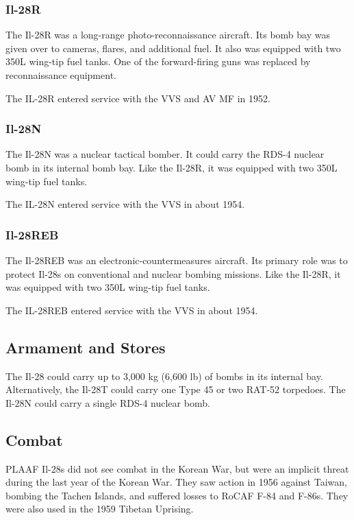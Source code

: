 \subsubsection{Il-28R}

The Il-28R was a long-range photo-reconnaissance aircraft. Its bomb bay was given over to cameras, flares, and additional fuel. It also was equipped with two 350L wing-tip fuel tanks. One of the forward-firing guns was replaced by reconnaissance equipment.

The IL-28R entered service with the VVS and AV MF in 1952.

\subsubsection{Il-28N}

The Il-28N was a nuclear tactical bomber. It could carry the RDS-4 nuclear bomb in its internal bomb bay. Like the Il-28R, it was equipped with two 350L wing-tip fuel tanks.

The IL-28N entered service with the VVS in about 1954.

\subsubsection{Il-28REB}

The Il-28REB was an electronic-countermeasures aircraft. Its primary role was to protect Il-28s on conventional and nuclear bombing missions. Like the Il-28R, it was equipped with two 350L wing-tip fuel tanks.

The IL-28REB entered service with the VVS in about 1954.

\subsection{Armament and Stores}

The Il-28 could carry up to 3,000 kg (6,600 lb) of bombs in its internal bay. Alternatively, the Il-28T could carry one Type 45 or two RAT-52 torpedoes. The Il-28N could carry a single RDS-4 nuclear bomb.

\subsection{Combat}

PLAAF Il-28s did not see combat in the Korean War, but were an implicit threat during the last year of the Korean War. They saw action in 1956 against Taiwan, bombing the Tachen Islands, and suffered losses to RoCAF F-84 and F-86s. They were also used in the 1959 Tibetan Uprising.

